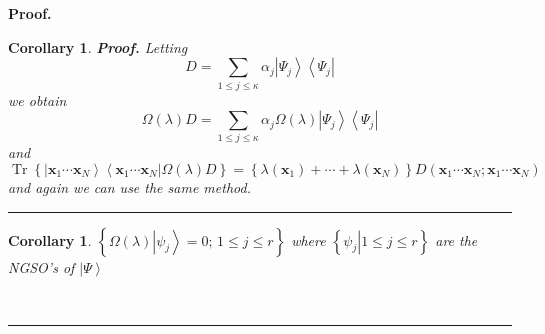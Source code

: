 \documentclass[aps,preprint]{revtex4}%
\newtheorem{corollary}[theorem]{Corollary}
\newenvironment{proof}[1][Proof]{\noindent\textbf{#1.} }{\ \rule{0.5em}{0.5em}}
\begin{document}
\begin{proof}
\begin{corollary}
\begin{proof}
Letting
\begin{equation}
D=\sum_{1\leq j\leq\kappa}\alpha_{j}\left\vert \Psi_{j}\right\rangle
\left\langle \Psi_{j}\right\vert
\end{equation}
we obtain
\begin{equation}
\Omega\left(  \lambda\right)  D=\sum_{1\leq j\leq\kappa}\alpha_{j}%
\Omega\left(  \lambda\right)  \left\vert \Psi_{j}\right\rangle \left\langle
\Psi_{j}\right\vert
\end{equation}
and
\begin{equation}
\operatorname{Tr}\left\{  \left\vert \mathbf{x}_{1}\cdots\mathbf{x}%
_{N}\right\rangle \left\langle \mathbf{x}_{1}\cdots\mathbf{x}_{N}\right\vert
\Omega\left(  \lambda\right)  D\right\}  =\left\{  \lambda\left(
\mathbf{x}_{1}\right)  +\cdots+\lambda\left(  \mathbf{x}_{N}\right)  \right\}
D\left(  \mathbf{x}_{1}\cdots\mathbf{x}_{N};\mathbf{x}_{1}\cdots\mathbf{x}%
_{N}\right)
\end{equation}
and again we can use the same method.
\end{proof}
\end{corollary}

\begin{corollary}
$\left\{  \Omega\left(  \lambda\right)  \left\vert \psi_{j}\right\rangle
=0;\,1\leq j\leq r\right\}  $ where $\left\{  \left.  \psi_{j}\right\vert
1\leq j\leq r\right\}  $ are the NGSO's of $\left\vert \Psi\right\rangle $
\end{corollary}
\end{proof}
\end{document}
